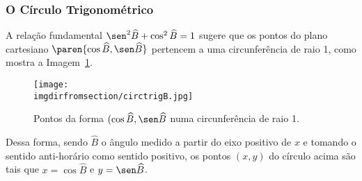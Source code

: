 \subsubsection{O Círculo Trigonométrico}

A relação fundamental $\sen^2 \widehat B + \cos^2 \widehat B = 1$
sugere que os pontos do plano cartesiano $\paren{\cos \widehat B,
\sen \widehat B}$ pertencem a uma circunferência de raio 1, como
mostra a Imagem~\ref{fig:circulo-trigonometrico-b}.
%
\begin{figure}
\centering
\texttt{[image: \\imgdirfromsection/circtrigB.jpg]}
\caption{Pontos da forma $(\cos \widehat B, \sen \widehat B$ numa circunferência de raio 1.}
\label{fig:circulo-trigonometrico-b}
\end{figure}

Dessa forma, sendo $\widehat B$ o ângulo medido a partir do eixo
positivo de $x$ e tomando o sentido anti-horário como sentido
positivo, os pontos $(x, y)$ do círculo acima são tais que $x = \cos
\widehat B$ e $y = \sen \widehat B$.